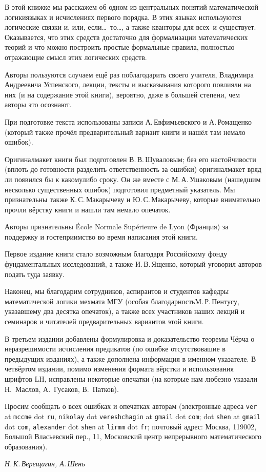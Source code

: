 В этой книжке мы расскажем об одном из центральных понятий
математической логики\т языках и исчислениях первого порядка. В
этих языках используются логические связки  и,  или,
 если\dots\  то\dots{}, а также кванторы  для всех\ и
 существует. Оказывается, что этих средств достаточно для
формализации математических теорий и что можно построить простые
формальные правила, полностью отражающие смысл этих логических
средств.

Авторы пользуются случаем ещё раз поблагодарить своего учителя,
Владимира Андреевича Успенского, лекции, тексты и высказывания
которого повлияли на них (и на содержание этой книги), вероятно,
даже в большей степени, чем авторы это осознают.

При подготовке текста использованы записи
А.\,Ев\-фимь\-евс\-ко\-го и А.\,Ро\-ма\-щен\-ко (который также
прочёл предварительный вариант книги и нашёл там немало ошибок).

Оригинал\д макет книги был подготовлен
В.\,В.\,Шу\-ва\-ло\-вым; без его настойчивости (вплоть до
готовности разделить ответственность за ошибки) оригинал\д макет
вряд ли появился бы к какому\д либо сроку. Он же вместе с
М.\,А.\,Уша\-ко\-вым (нашедшим несколько существенных ошибок)
подготовил предметный указатель. Мы признательны также
К.\,С.\,Ма\-ка\-ры\-че\-ву и Ю.\,С.\,Ма\-ка\-ры\-че\-ву, которые внимательно
прочли вёрстку книги и нашли там немало опечаток.

Авторы признательны \'Ecole Normale Sup\'erieure de Lyon
(Франция) за поддержку и гостеприимство во время написания этой
книги.

Первое издание книги стало возможным благодаря Российскому фонду
фундаментальных исследований, а также И.\,В.\,Ященко, который
уговорил авторов подать туда заявку.

Наконец, мы благодарим сотрудников, аспирантов и студентов
кафедры математической логики мехмата МГУ (особая
благодарность\т М.\,Р.\,Пентусу, указавшему два десятка
опечаток), а также всех участников наших лекций и семинаров и
читателей предварительных вариантов этой книги.

В третьем издании добавлены формулировка и доказательство
теоремы Чёрча о неразрешимости исчисления предикатов (по ошибке
отсутствовашие в предыдущих изданиях), а также дополнена
информация в именном указателе. В четвёртом издании, помимо
изменения формата вёрстки и использования шрифтов LH, исправлены
некоторые опечатки (на которые нам любезно указали Н.~Маслов, А.~Гусаков, В.~Патков).

Просим сообщать о всех ошибках и опечатках авторам (электронные
адреса \texttt{ver} at \texttt{mccme} dot \texttt{ru},
\texttt{nikolay} dot \texttt{vereshchagin} at \texttt{gmail} dot
\texttt{com};  dot \texttt{shen} at \texttt{gmail} dot \texttt{com},
\texttt{alexander} dot \texttt{shen} at \texttt{lirmm} dot \texttt{fr}; почтовый адрес: Москва,
119002, Большой Власьевский пер., 11, Московский центр
непрерывного математического образования).

\begin{flushright}
\textit{Н.\,К.\,Верещагин, А.\,Шень}
\end{flushright}
